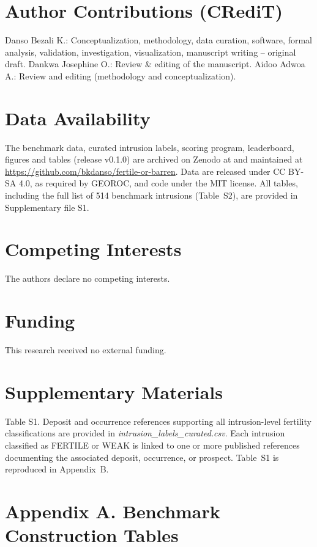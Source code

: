 \documentclass[10pt,twocolumn,letterpaper]{article}
\begin{document}
\section*{Author Contributions (CRediT)}
Danso Bezali K.: Conceptualization, methodology, data curation, software, formal analysis, validation, investigation, visualization, manuscript writing -- original draft. Dankwa Josephine O.: Review \& editing of the manuscript. Aidoo Adwoa A.: Review and editing (methodology and conceptualization).

\section*{Data Availability}
The benchmark data, curated intrusion labels, scoring program, leaderboard, figures and tables (release v0.1.0) are archived on Zenodo at  and maintained at \url{https://github.com/bkdanso/fertile-or-barren}. Data are released under CC BY-SA 4.0, as required by GEOROC, and code under the MIT license. All tables, including the full list of 514 benchmark intrusions (Table~S2), are provided in Supplementary file S1.

\section*{Competing Interests}
The authors declare no competing interests.

\section*{Funding}
This research received no external funding.

\section*{Supplementary Materials}
Table S1. Deposit and occurrence references supporting all intrusion-level fertility classifications are provided in \textit{intrusion\_labels\_curated.csv}. Each intrusion classified as FERTILE or WEAK is linked to one or more published references documenting the associated deposit, occurrence, or prospect. Table~S1 is reproduced in Appendix~B.

\onecolumn
\appendix
\renewcommand{\thetable}{A\arabic{table}}
\setcounter{table}{0}
\captionsetup[table]{name=Table}
\section*{Appendix A. Benchmark Construction Tables}
\end{document}
